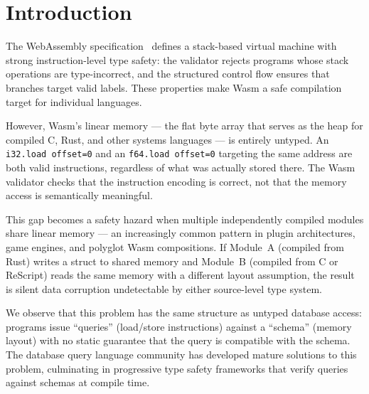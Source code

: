 \documentclass[sigplan,nonacm,screen]{acmart}
\begin{document}

\maketitle

\section{Introduction}
\label{sec:introduction}

The WebAssembly specification~\cite{haas2017} defines a stack-based
virtual machine with strong instruction-level type safety: the validator
rejects programs whose stack operations are type-incorrect, and the
structured control flow ensures that branches target valid labels. These
properties make Wasm a safe compilation target for individual languages.

However, Wasm's linear memory --- the flat byte array that serves as the
heap for compiled C, Rust, and other systems languages --- is entirely
untyped. An \texttt{i32.load offset=0} and an \texttt{f64.load offset=0}
targeting the same address are both valid instructions, regardless of
what was actually stored there. The Wasm validator checks that the
instruction encoding is correct, not that the memory access is
semantically meaningful.

This gap becomes a safety hazard when multiple independently compiled
modules share linear memory --- an increasingly common pattern in plugin
architectures, game engines, and polyglot Wasm compositions. If Module~A
(compiled from Rust) writes a struct to shared memory and Module~B
(compiled from C or ReScript) reads the same memory with a different
layout assumption, the result is silent data corruption undetectable by
either source-level type system.

We observe that this problem has the same structure as untyped database
access: programs issue ``queries'' (load/store instructions) against a
``schema'' (memory layout) with no static guarantee that the query is
compatible with the schema. The database query language community has
developed mature solutions to this problem, culminating in progressive
type safety frameworks that verify queries against schemas at compile time.
\end{document}
